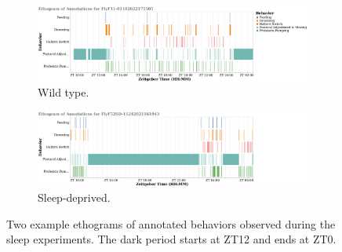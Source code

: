 \begin{figure}[htb!]
	\centering
	\begin{subfigure}[ht!]{0.975\linewidth}
		\centering\includegraphics[width=\linewidth]{figures/FlyF11-01182022175505_annotation_ethogram.pdf}
		\caption{Wild type.}
	\end{subfigure}%

	\centering
	\begin{subfigure}[ht!]{0.975\linewidth}
		\centering\includegraphics[width=\linewidth]{figures/FlyF52SD-11242021161943_annotation_ethogram.pdf}
		\caption{Sleep-deprived.}
	\end{subfigure}%
	\caption[Two example ethograms of annotated behaviors observed during the sleep experiments.]{Two example ethograms of annotated behaviors observed during the sleep experiments. The dark period starts at ZT12 and ends at ZT0. \label{figure:example-ethograms}}
\end{figure}
